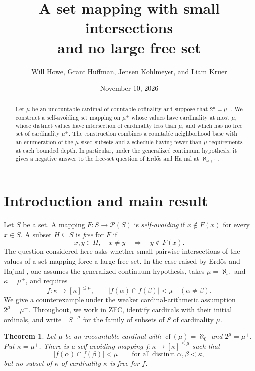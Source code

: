 \documentclass[10pt,leqno]{amsart}
\title[A set mapping with small intersections]{A set mapping with small intersections\protect\\ and no large free set}
\author[W. Howe, G. Huffman, J. Kohlmeyer, and L. Kruer]{Will Howe, Grant Huffman, Jensen Kohlmeyer, and Liam Kruer}
\date{November 10, 2026}
\newtheorem{theorem}{Theorem}[section]
\numberwithin{equation}{section}
\newcommand{\cf}{\operatorname{cf}}
\begin{document}
\begin{abstract}
Let $\mu$ be an uncountable cardinal of countable cofinality and suppose that
$2^\mu=\mu^+$. We construct a self-avoiding set mapping on $\mu^+$ whose values
have cardinality at most $\mu$, whose distinct values have intersection of
cardinality less than $\mu$, and which has no free set of cardinality $\mu^+$.
The construction combines a countable neighborhood base with an enumeration
of the $\mu$-sized subsets and a schedule having fewer than $\mu$ requirements
at each bounded depth. In particular, under the generalized continuum
hypothesis, it gives a negative answer to the free-set question of Erd\H{o}s
and Hajnal at $\aleph_{\omega+1}$.
\end{abstract}
\maketitle

\section{Introduction and main result}

Let $S$ be a set. A mapping $F:S\to\mathcal P(S)$ is \emph{self-avoiding} if
$x\notin F(x)$ for every $x\in S$. A subset $H\subseteq S$ is \emph{free} for $F$ if
\[
  x,y\in H,\quad x\ne y\quad\Longrightarrow\quad y\notin F(x).
\]
The question considered here asks whether small pairwise intersections of
the values of a set mapping force a large free set. In the case raised by
Erd\H{o}s and Hajnal \cite[Problem~35]{EH}, one assumes the generalized
continuum hypothesis, takes $\mu=\aleph_\omega$ and $\kappa=\mu^+$, and requires
\[
  f:\kappa\longrightarrow[\kappa]^{\leq\mu},\qquad
  |f(\alpha)\cap f(\beta)|<\mu\quad(\alpha\ne\beta).
\]
We give a counterexample under the weaker cardinal-arithmetic assumption
$2^\mu=\mu^+$. Throughout, we work in ZFC, identify cardinals with their
initial ordinals, and write $[S]^\mu$ for the family of subsets of $S$ of
cardinality $\mu$.

\begin{theorem}\label{thm:main}
Let $\mu$ be an uncountable cardinal with $\cf(\mu)=\aleph_0$ and
$2^\mu=\mu^+$. Put $\kappa=\mu^+$. There is a self-avoiding mapping
$f:\kappa\to[\kappa]^{\leq\mu}$ such that
\[
  |f(\alpha)\cap f(\beta)|<\mu
  \qquad\text{for all distinct }\alpha,\beta<\kappa,
\]
but no subset of $\kappa$ of cardinality $\kappa$ is free for $f$.
\end{theorem}
\end{document}
